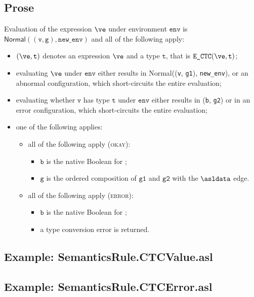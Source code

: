 \documentclass{book}
\newcommand\ProseOrAbnormal[0]{or an abnormal configuration, which short-circuits the entire evaluation}
\newcommand\Normal[0]{\textsf{Normal}}
\newcommand\newenv[0]{\texttt{new\_env}}
\newcommand\env[0]{\texttt{env}}
\newcommand\vg[0]{\texttt{g}}
\newcommand\vv[0]{\texttt{v}}
\newcommand\vt[0]{\texttt{t}}
\newcommand\vgone[0]{\texttt{g1}}
\newcommand\vgtwo[0]{\texttt{g2}}
\newcommand\vb[0]{\texttt{b}}
\begin{document}
  \subsection{Prose}
  Evaluation of the expression $\ve$ under environment $\env$ is \\
  $\Normal((\vv, \vg), \newenv)$ and all of the following apply:
  \begin{itemize}
  \item $(\ve, \vt)$ denotes an expression $\ve$ and a type $\vt$,
  that is $\texttt{E\_CTC}(\ve, \vt)$;
  \item evaluating $\ve$ under $\env$ either results in \Normal((\vv, \vgone), \newenv),
  \ProseOrAbnormal;
  \item evaluating whether $\vv$ has type $\vt$ under $\env$ either results in (\vb, \vgtwo)
  or in an error configuration, which short-circuits the entire evaluation;
  \item one of the following applies:
        \begin{itemize}
        \item all of the following apply (\textsc{okay}):
              \begin{itemize}
              \item $\vb$ is the native Boolean for \True;
              \item $\vg$ is the ordered composition of $\vgone$ and $\vgtwo$ with the $\asldata$ edge.
              \end{itemize}
        \item all of the following apply (\textsc{error}):
              \begin{itemize}
              \item $\vb$ is the native Boolean for \True;
              \item a type conversion error is returned.
              \end{itemize}
        \end{itemize}
  \end{itemize}

  \subsection{Example: SemanticsRule.CTCValue.asl}

  \subsection{Example: SemanticsRule.CTCError.asl}
\end{document}
